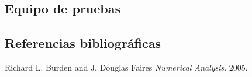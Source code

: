 \subsection{Equipo de pruebas}
\subsection{Referencias bibliogr\'aficas}
\begin{thebibliography}{9}

  Richard L. Burden and J. Douglas Faires
  \emph{Numerical Analysis}.
  2005.
\end{thebibliography}
